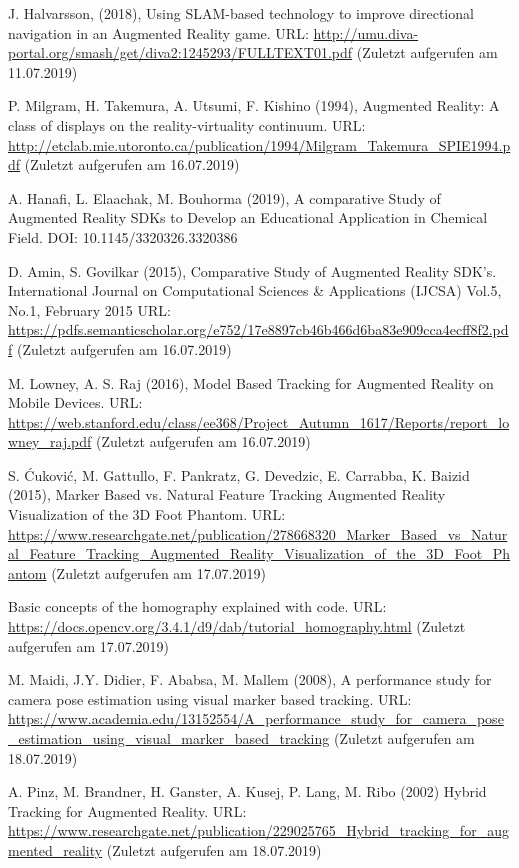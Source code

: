 \documentclass[12pt,oneside]{scrreprt}
\begin{document}
\begin{thebibliography}{10}
 J. Halvarsson, (2018), Using SLAM-based technology to improve directional navigation in an Augmented Reality game. URL: \url{http://umu.diva-portal.org/smash/get/diva2:1245293/FULLTEXT01.pdf} (Zuletzt aufgerufen am 11.07.2019)

 P. Milgram, H. Takemura, A. Utsumi, F. Kishino (1994), Augmented Reality: A class of displays on the reality-virtuality continuum. URL: \url{http://etclab.mie.utoronto.ca/publication/1994/Milgram_Takemura_SPIE1994.pdf} (Zuletzt aufgerufen am 16.07.2019)

 A. Hanafi, L. Elaachak, M. Bouhorma (2019), A comparative Study of Augmented Reality SDKs to Develop an Educational Application in Chemical Field. DOI: 10.1145/3320326.3320386

 D. Amin, S. Govilkar (2015), Comparative Study of Augmented Reality
SDK’s. International Journal on Computational Sciences \& Applications (IJCSA) Vol.5, No.1, February 2015 URL: \url{https://pdfs.semanticscholar.org/e752/17e8897cb46b466d6ba83e909cca4ecff8f2.pdf} (Zuletzt aufgerufen am 16.07.2019)

 M. Lowney, A. S. Raj (2016), Model Based Tracking for Augmented Reality
on Mobile Devices. URL: \url{https://web.stanford.edu/class/ee368/Project_Autumn_1617/Reports/report_lowney_raj.pdf} (Zuletzt aufgerufen am 16.07.2019)

 S. Ćuković, M. Gattullo, F. Pankratz, G. Devedzic, E. Carrabba, K. Baizid (2015), Marker Based vs. Natural Feature Tracking Augmented Reality Visualization of the 3D Foot Phantom. URL: \url{https://www.researchgate.net/publication/278668320_Marker_Based_vs_Natural_Feature_Tracking_Augmented_Reality_Visualization_of_the_3D_Foot_Phantom} (Zuletzt aufgerufen am 17.07.2019)

 Basic concepts of the homography explained with code. URL: \url{https://docs.opencv.org/3.4.1/d9/dab/tutorial_homography.html} (Zuletzt aufgerufen am 17.07.2019)

 M. Maidi, J.Y. Didier, F. Ababsa, M. Mallem (2008), A performance study for camera pose estimation using visual marker based tracking. URL: \url{https://www.academia.edu/13152554/A_performance_study_for_camera_pose_estimation_using_visual_marker_based_tracking}
(Zuletzt aufgerufen am 18.07.2019)

 A. Pinz, M. Brandner, H. Ganster, A. Kusej, P. Lang, M. Ribo (2002) Hybrid Tracking for Augmented Reality. URL: \url{https://www.researchgate.net/publication/229025765_Hybrid_tracking_for_augmented_reality} (Zuletzt aufgerufen am 18.07.2019)


\end{thebibliography}
\end{document}
